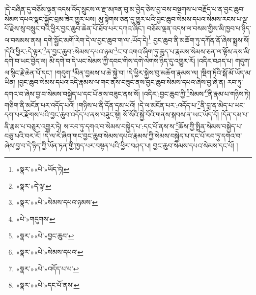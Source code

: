 །དེ་བཞིན་དུ་བཅོམ་ལྡན་འདས་འོད་སྲུངས་ལ་རྫ་མཁན་བུ་མ་བྱེད་ཅེས་བྱ་བས་བསྔགས་པ་བརྗོད་པ་ན་བྱང་ཆུབ་སེམས་དཔའ་སྣང་སྐྱོང་བྲམ་ཟེར་གྱུར་པས། མུ་སྟེགས་ཅན་དུ་གྱུར་པའི་བྱང་ཆུབ་སེམས་དཔའ་སེམས་རངས་པ་ལྔ་པོ་རྗེས་སུ་བསྲུང་བའི་ཕྱིར་བྱང་ཆུབ་ཆེན་པོ་ཐོབ་པར་དཀའ་ཞིང་། བཅོམ་ལྡན་འདས་ལ་བསམ་གྱིས་མི་ཁྱབ་པ་ཉིད་ལ་བསམས་ནས། དགེ་སྦྱོང་མགོ་རེག་དེ་ལ་བྱང་ཆུབ་ག་ལ་:ཡོད་དེ།\footnote{«སྣར་»«པེ་»ཡོད་ཏེ།} བྱང་ཆུབ་ནི་མཆོག་ཏུ་དཀོན་ནོ་ཞེས་སྨྲས་སོ། །དེའི་ཕྱིར་:དེ་ལྟར་\footnote{«སྣར་»དེ་ལྟ་}ན་བྱང་ཆུབ་:སེམས་དཔའ་ཉམ་\footnote{«སྣར་»«པེ་»སེམས་དཔའ་ཉམས་}ང་བ་འགའ་ཞིག་ཏུ་ཆུད་པ་རྣམས་སེམས་ཅན་ལ་ལྟོས་ནས་མི་དགེ་བ་ཡང་བྱེད་ལ། མི་དགེ་བ་དེ་ཡང་སེམས་ཀྱི་དབང་གིས་དགེ་ལེགས་ཉིད་དུ་འགྱུར་རོ། །འདིར་བཤད་པ། གདུག་ལ་སྙིང་རྗེ་ཆེན་པོ་དང་། །གདུག་\footnote{«པེ་»གདུགས་}མིན་བྱམས་པ་ཆེ་སྐྱེ་བ། །དེ་ཕྱིར་སྐྱེས་བུ་མཆོག་རྣམས་ལ། །སྡིག་ཏོའི་སྒོ་མོ་ཡོད་མ་ཡིན། །བྱང་ཆུབ་སེམས་དཔའ་འདི་རྣམས་ལ་གང་ནས་བཟུང་ནས་བྱང་ཆུབ་སེམས་དཔའ་ཞེས་བྱ་ཞེ་ན། རབ་ཏུ་དགའ་བ་ཞེས་བྱ་བ་སེམས་བསྐྱེད་པ་དང་པོ་ནས་བཟུང་ནས་སོ། །འདིར་:བྱང་ཆུབ་ཀྱི་\footnote{«སྣར་»«པེ་»བྱང་ཆུབ་}སེམས་\footnote{«སྣར་»«པེ་»སེམས་དཔའ་}ནི་རྣམ་པ་གཉིས་ཏེ། གཅིག་ནི་མངོན་པར་འདོད་པའོ། །གཉིས་པ་ནི་དོན་དམ་པའོ། །དེ་ལ་མངོན་པར་:འདོད་པ་\footnote{«སྣར་»«པེ་»འདོད་པ་པ་}ནི་བླ་ན་མེད་པ་ཡང་དག་པར་རྫོགས་པའི་བྱང་ཆུབ་འདོད་པ་ནས་བཟུང་སྟེ། སོ་སོའི་སྐྱེ་བོའི་གནས་སྐབས་ན་ཡང་ཡོད་དོ། །དོན་དམ་པ་ནི་རྣམ་པ་བཅུར་འགྱུར་ཏེ། ས་རབ་ཏུ་དགའ་བ་སེམས་བསྐྱེད་པ་:དང་པོ་ནས་ས་\footnote{«སྣར་»«པེ་»དང་པོ་ནས་}ཆོས་ཀྱི་སྤྲིན་སེམས་བསྐྱེད་པ་བཅུ་པའི་བར་རོ། །དེ་ལ་རེ་ཞིག་གང་བྱང་ཆུབ་སེམས་དཔའ་རྣམས་ཀྱི་སེམས་བསྐྱེད་པ་དང་པོ་རབ་ཏུ་དགའ་བ་ཞེས་བྱ་བ་དེ་ཉིད་ཀྱི་ཡོན་ཏན་གྱི་ཁྱད་པར་བསྟན་པའི་ཕྱིར་བཤད་པ། བྱང་ཆུབ་སེམས་དཔའ་སེམས་དང་པོ། །
